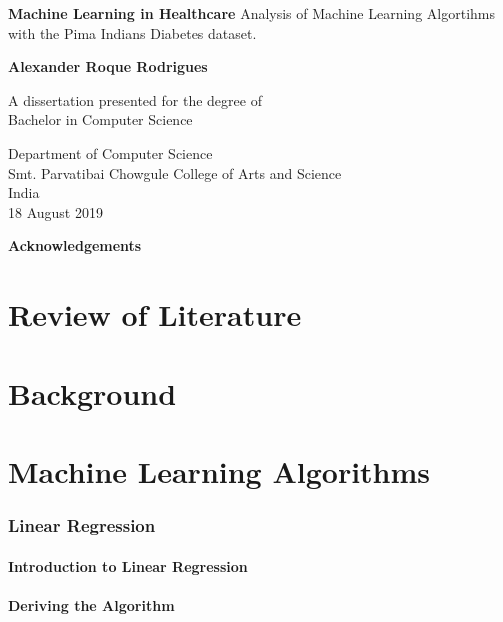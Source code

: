 \documentclass[12pt]{article}
\begin{document}
\begin{titlepage}
    \begin{center}
        \vspace*{1cm} 
        \Huge
        \textbf{Machine Learning in Healthcare} 
        \vspace{0.5cm}
        \normalsize
        \vspace{0cm}
        Analysis of Machine Learning Algortihms with the Pima Indians Diabetes dataset.
 
        \vspace{1.5cm}
 
        \textbf{Alexander Roque Rodrigues}
 
        \vfill
 
        A dissertation presented for the degree of\\
        Bachelor in Computer Science
 
        \vspace{0.8cm}
  
        \Large
        Department of Computer Science\\        
        Smt. Parvatibai Chowgule College of Arts and Science\\
        India\\
        18 August 2019
 
    \end{center}
\end{titlepage}
\Huge
\newpage
\huge
\textbf{Acknowledgements}
\normalsize
\newpage
\tableofcontents
\newpage
\part{Review of Literature}
\newpage
\part{Background}
\newpage
\part{Machine Learning Algorithms}
\newpage
\section{Linear Regression}
\subsection{Introduction to Linear Regression}
\subsection{Deriving the Algorithm}
\end{document}
